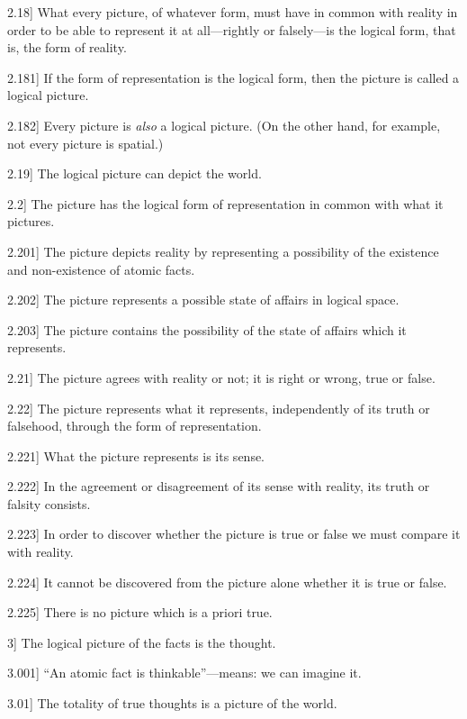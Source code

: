 \documentclass[12pt,oneside]{book}[2007/10/19]
\newcommand{\PropositionE}[2]{%
  \item[\phantomsection\label{PropE:#1}\PropGRef{#1}] #2%
}
\newcommand{\PropGRef}[1]{\hyperref[PropG:#1]{#1}}
\begin{document}
\begin{propositions}
\PropositionE{2.18}
{What every picture, of whatever form, must
have in common with reality in order to be able to
represent it at all---rightly or falsely---is the logical
form, that is, the form of reality.}


\PropositionE{2.181}
{If the form of representation is the logical form,
then the picture is called a logical picture.}


\PropositionE{2.182}
{Every picture is \emph{also} a logical picture. (On the
other hand, for example, not every picture is spatial.)}


\PropositionE{2.19}
{The logical picture can depict the world.}


\PropositionE{2.2}
{The picture has the logical form of representation
in common with what it pictures.}


\PropositionE{2.201}
{The picture depicts reality by representing a
possibility of the existence and non-existence of
atomic facts.}


\PropositionE{2.202}
{The picture represents a possible state of affairs
in logical space.}


\PropositionE{2.203}
{The picture contains the possibility of the state
of affairs which it represents.}


\PropositionE{2.21}
{The picture agrees with reality or not; it is
right or wrong, true or false.}


\PropositionE{2.22}
{The picture represents what it represents, independently
of its truth or falsehood, through the
form of representation.}


\PropositionE{2.221}
{What the picture represents is its sense.}


\PropositionE{2.222}
{In the agreement or disagreement of its sense
with reality, its truth or falsity consists.}


\PropositionE{2.223}
{In order to discover whether the picture is true
or false we must compare it with reality.}


\PropositionE{2.224}
{It cannot be discovered from the picture alone
whether it is true or false.}


\PropositionE{2.225}
{There is no picture which is a priori true.}


\PropositionE{3}
{The logical picture of the facts is the
thought.}


\PropositionE{3.001}
{``An atomic fact is thinkable''---means: we can
imagine it.}


\PropositionE{3.01}
{The totality of true thoughts is a picture of the
world.}



\end{propositions}
\end{document}
